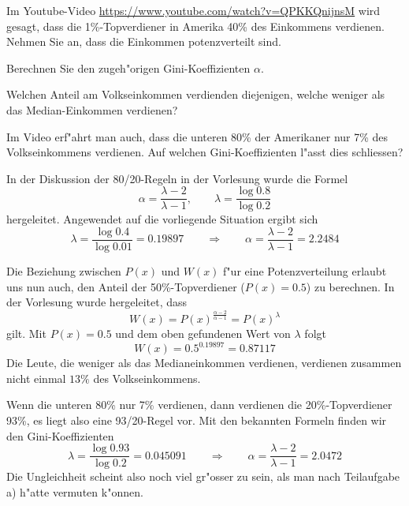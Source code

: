 Im Youtube-Video \url{https://www.youtube.com/watch?v=QPKKQnijnsM} wird
gesagt, dass die 1\%-Topverdiener in Amerika 40\% des Einkommens
verdienen. Nehmen Sie an, dass die Einkommen potenzverteilt sind.
\begin{teilaufgaben}
\item
Berechnen Sie den zugeh"origen Gini-Koeffizienten $\alpha$.
\item
Welchen Anteil am Volkseinkommen verdienden diejenigen, welche
weniger als das Median-Einkommen verdienen?
\item
Im Video erf"ahrt man auch, dass die unteren 80\% der Amerikaner nur
7\% des Volkseinkommens verdienen. 
Auf welchen Gini-Koeffizienten l"asst dies schliessen?
\end{teilaufgaben}

\begin{loesung}
\begin{teilaufgaben}
\item
In der Diskussion der 80/20-Regeln in der Vorlesung wurde die Formel
\[
\alpha=\frac{\lambda-2}{\lambda-1},\qquad \lambda=\frac{\log 0.8}{\log 0.2}
\]
hergeleitet. Angewendet auf die vorliegende Situation ergibt sich
\[
\lambda=\frac{\log 0.4}{\log 0.01}=0.19897
\qquad
\Rightarrow
\qquad
\alpha=\frac{\lambda - 2}{\lambda - 1}=2.2484
\]
\item
Die Beziehung zwischen $P(x)$ und $W(x)$ f"ur eine Potenzverteilung erlaubt
uns nun auch, den Anteil der 50\%-Topverdiener ($P(x)=0.5$) zu berechnen.
In der Vorlesung wurde hergeleitet, dass 
\[
W(x)=P(x)^\frac{\alpha - 2}{\alpha - 1}=P(x)^\lambda
\]
gilt. Mit $P(x)=0.5$ und dem oben gefundenen Wert von $\lambda$
folgt
\[
W(x)=0.5^{0.19897}=0.87117
\]
Die Leute, die weniger als das Medianeinkommen verdienen, verdienen zusammen
nicht einmal $13\%$ des Volkseinkommens.
\item
Wenn die unteren 80\% nur 7\% verdienen, dann verdienen die 20\%-Topverdiener
93\%, es liegt also eine 93/20-Regel vor. Mit den bekannten Formeln finden
wir den Gini-Koeffizienten
\[
\lambda=\frac{\log 0.93}{\log 0.2}=0.045091
\qquad\Rightarrow\qquad
\alpha=\frac{\lambda - 2}{\lambda - 1}=2.0472
\]
Die Ungleichheit scheint also noch viel gr"osser zu sein, als
man nach Teilaufgabe a) h"atte vermuten k"onnen.
\qedhere
\end{teilaufgaben}
\end{loesung}

